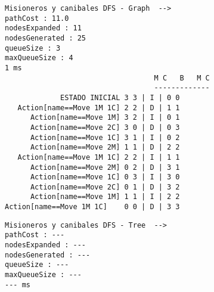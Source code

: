 \documentclass{article}
\begin{document}
\begin{multicols}{2}
\begin{Verbatim}[fontsize=\footnotesize]
Misioneros y canibales DFS - Graph  -->
pathCost : 11.0
nodesExpanded : 11
nodesGenerated : 25
queueSize : 3
maxQueueSize : 4
1 ms
                                   M C   B   M C
                                   -------------
             ESTADO INICIAL	3 3 | I | 0 0
   Action[name==Move 1M 1C]	2 2 | D | 1 1
      Action[name==Move 1M]	3 2 | I | 0 1
      Action[name==Move 2C]	3 0 | D | 0 3
      Action[name==Move 1C]	3 1 | I | 0 2
      Action[name==Move 2M]	1 1 | D | 2 2
   Action[name==Move 1M 1C]	2 2 | I | 1 1
      Action[name==Move 2M]	0 2 | D | 3 1
      Action[name==Move 1C]	0 3 | I | 3 0
      Action[name==Move 2C]	0 1 | D | 3 2
      Action[name==Move 1M]	1 1 | I | 2 2
Action[name==Move 1M 1C]	0 0 | D | 3 3
\end{Verbatim}
\begin{Verbatim}[fontsize=\footnotesize]
Misioneros y canibales DFS - Tree  -->
pathCost : ---
nodesExpanded : ---
nodesGenerated : ---
queueSize : ---
maxQueueSize : ---
--- ms














\end{Verbatim}
\end{multicols}
        
  
\end{document}
